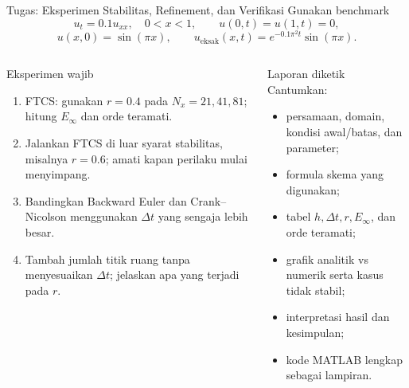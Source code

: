 \documentclass[aspectratio=169,10pt]{beamer}
\begin{document}
\begin{frame}{Tugas: Eksperimen Stabilitas, Refinement, dan Verifikasi}
\footnotesize
Gunakan benchmark
\[
u_t=0.1u_{xx},\quad 0<x<1,\qquad
u(0,t)=u(1,t)=0,
\]
\[
u(x,0)=\sin(\pi x),\qquad
u_{\text{eksak}}(x,t)=e^{-0.1\pi^2t}\sin(\pi x).
\]
\begin{columns}[T,onlytextwidth]
\begin{block}{Eksperimen wajib}
\begin{enumerate}
  \item FTCS: gunakan $r=0.4$ pada $N_x=21,41,81$; hitung $E_\infty$ dan orde teramati.
  \item Jalankan FTCS di luar syarat stabilitas, misalnya $r=0.6$; amati kapan perilaku mulai menyimpang.
  \item Bandingkan Backward Euler dan Crank--Nicolson menggunakan $\Delta t$ yang sengaja lebih besar.
  \item Tambah jumlah titik ruang tanpa menyesuaikan $\Delta t$; jelaskan apa yang terjadi pada $r$.
\end{enumerate}
\end{block}
\begin{block}{Laporan diketik}
Cantumkan:
\begin{itemize}
  \item persamaan, domain, kondisi awal/batas, dan parameter;
  \item formula skema yang digunakan;
  \item tabel $h,\Delta t,r,E_\infty$, dan orde teramati;
  \item grafik analitik vs numerik serta kasus tidak stabil;
  \item interpretasi hasil dan kesimpulan;
  \item kode MATLAB lengkap sebagai lampiran.
\end{itemize}
\end{block}
\end{columns}
\end{frame}
\end{document}
